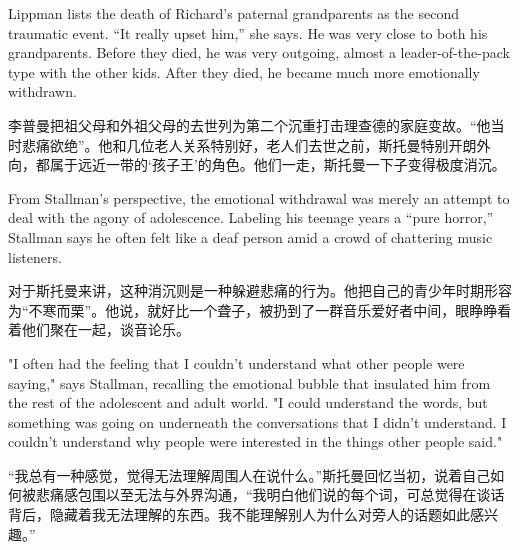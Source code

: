 \ifdefined\eng
Lippman lists the death of Richard's paternal grandparents as the second traumatic event. ``It really upset him,'' she says. He was very close to both his grandparents. Before they died, he was very outgoing, almost a leader-of-the-pack type with the other kids. After they died, he became much more emotionally withdrawn.
\fi

\ifdefined\chs
李普曼把祖父母和外祖父母的去世列为第二个沉重打击理查德的家庭变故。``他当时悲痛欲绝''。他和几位老人关系特别好，老人们去世之前，斯托曼特别开朗外向，都属于远近一带的`孩子王'的角色。他们一走，斯托曼一下子变得极度消沉。
\fi

\ifdefined\eng
From Stallman's perspective, the emotional withdrawal was merely an attempt to deal with the agony of adolescence. Labeling his teenage years a ``pure horror,'' Stallman says he often felt like a deaf person amid a crowd of chattering music listeners.
\fi

\ifdefined\chs
对于斯托曼来讲，这种消沉则是一种躲避悲痛的行为。他把自己的青少年时期形容为``不寒而栗''。他说，就好比一个聋子，被扔到了一群音乐爱好者中间，眼睁睁看着他们聚在一起，谈音论乐。
\fi

\ifdefined\eng
"I often had the feeling that I couldn't understand what other people were saying," says Stallman, recalling the emotional bubble that insulated him from the rest of the adolescent and adult world. "I could understand the words, but something was going on underneath the conversations that I didn't understand. I couldn't understand why people were interested in the things other people said."

\fi

\ifdefined\chs
``我总有一种感觉，觉得无法理解周围人在说什么。''斯托曼回忆当初，说着自己如何被悲痛感包围以至无法与外界沟通，``我明白他们说的每个词，可总觉得在谈话背后，隐藏着我无法理解的东西。我不能理解别人为什么对旁人的话题如此感兴趣。''
\fi

